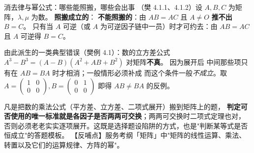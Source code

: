 \begin{fdeep}{消去律与幂公式：哪些能照搬，哪些会出事}
（樊 4.1.1、4.1.2）设 $A,B,C$ 为矩阵，$\lambda,\mu$ 为数。
\textbf{照搬成立的}：
\textbf{不能照搬的}：由 $AB=AC$ 且 $A\ne O$ \textbf{推不出} $B=C$。
只有当 $A$ 可逆（或 $A$ 为可逆因子链中一员）时才可约去：由 $AB=AC$ 且 $A$ 可逆得 $B=C$。

由此派生的一类典型错误（樊例 4.1）：数的立方差公式 $A^3-B^3=(A-B)(A^2+AB+B^2)$ 对矩阵\textbf{不真}。
因为展开后
中间那些项只有在 $AB=BA$ 时才相消；一般情形必须补成
而这个条件一般\emph{不成立}。取 $A=\begin{pmatrix}1&0\\0&0\end{pmatrix},
B=\begin{pmatrix}0&1\\0&0\end{pmatrix}$ 即得 $AB\ne BA$ 的反例。

凡是把数的乘法公式（平方差、立方差、二项式展开）搬到矩阵上的题，
\textbf{判定可否使用的唯一标准就是各因子是否两两可交换}；两两可交换时二项式定理也对，
否则必须老老实实逐项展开。这既是选择题设陷阱的方式，也是"判断某等式是否恒成立"的答题模板。
【反哺点】服务考纲「矩阵」中"矩阵的线性运算、乘法、转置以及它们的运算规律、方阵的幂"。
\end{fdeep}

